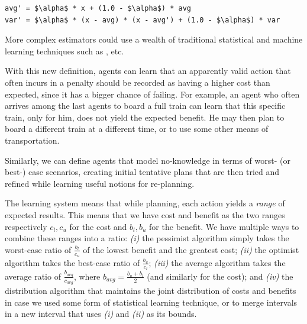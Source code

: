 \begin{lstlisting}
avg' = $\alpha$ * x + (1.0 - $\alpha$) * avg
var' = $\alpha$ * (x - avg) * (x - avg') + (1.0 - $\alpha$) * var
\end{lstlisting}

More complex estimators could use a wealth of traditional statistical and machine learning techniques such as \cite{APPENDIX_C_REINFORCEMENT_LEARNING,APPENDIX_C_STATISTICAL_PATTERN_RECOGNITION}, etc.

With this new definition, agents can learn that an apparently valid action that often incurs in a penalty should be recorded as having a higher cost than expected, since it has a bigger chance of failing. For example, an agent who often arrives among the last agents to board a full train can learn that this specific train, only for him, does not yield the expected benefit. He may then plan to board a different train at a different time, or to use some other means of transportation. 

Similarly, we can define agents that model no-knowledge in terms of worst- (or best-) case scenarios, creating initial tentative plans that are then tried and refined while learning useful notions for re-planning.

The learning system means that while planning, each action yields a \textit{range} of expected results. This means that we have cost and benefit as the two ranges respectively $c_l, c_u$ for the cost and $b_l, b_u$ for the benefit. We have multiple ways to combine these ranges into a ratio: \textit{(i)} the pessimist algorithm simply takes the worst-case ratio of $\frac{b_l}{c_u}$ of the lowest benefit and the greatest cost; \textit{(ii)} the optimist algorithm takes the best-case ratio of $\frac{b_u}{c_l}$; \textit{(iii)} the average algorithm takes the average ratio of $\frac{b_{avg}}{c_{avg}}$, where $b_{avg} = \frac{b_u+b_l}{2}$ (and similarly for the cost); and \textit{(iv)} the distribution algorithm that maintains the joint distribution of costs and benefits in case we used some form of statistical learning technique, or to merge intervals in a new interval that uses \textit{(i)} and \textit{(ii)} as its bounds.



